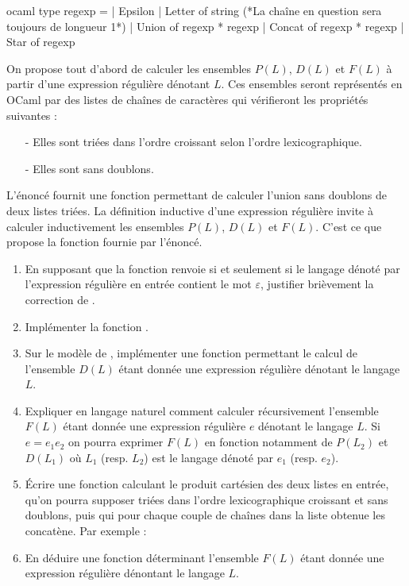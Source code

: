 \documentclass[a4paper, 11pt]{article}
\newenvironment{code-env}
{
  \mdfsetup{
    roundcorner=2pt,
    topline=true,
    leftline=true,
    bottomline=true,
    rightline=true,
    innertopmargin=4pt,
    innerbottommargin=4pt,
    innerrightmargin=4pt,
    innerlinewidth=1pt,
    backgroundcolor={gray!10},
    linecolor={gray!40},
    linewidth=0.1pt,
  }
  \begin{mdframed}[]
  }{\end{mdframed}}
\newenvironment{fancy-code}[1]
  {\VerbatimEnvironment
    \begin{code-env}
    \begin{verbatim}}
 {\end{verbatim}\end{code-env}}
\begin{document}
\medskip

\begin{fancy-code}{ocaml}
type regexp =
  | Epsilon
  | Letter of string (*La chaîne en question sera toujours de longueur 1*)
  | Union of regexp * regexp
  | Concat of regexp * regexp
  | Star of regexp

\end{fancy-code}

On propose tout d'abord de calculer les ensembles $P(L)$, $D(L)$ et $F(L)$ à partir d'une expression régulière dénotant $L$. Ces ensembles seront représentés en OCaml par des listes de chaînes de caractères qui vérifieront les propriétés suivantes : \begin{itemize}
    \item[-] Elles sont triées dans l'ordre croissant selon l'ordre lexicographique.
    \item[-] Elles sont sans doublons.
\end{itemize}

 L'énoncé fournit une fonction  permettant de calculer l'union sans doublons de deux listes triées. La définition inductive d'une expression régulière invite à calculer inductivement les ensembles $P(L)$, $D(L)$ et $F(L)$. C'est ce que propose la fonction  fournie par l'énoncé.

\begin{enumerate}[resume]
    \item En supposant que la fonction  renvoie  si et seulement si le langage dénoté par l'expression régulière en entrée contient le mot $\varepsilon$, justifier brièvement la correction de .
    \item Implémenter la fonction .
    \item Sur le modèle de , implémenter une fonction  permettant le calcul de l'ensemble $D(L)$ étant donnée une expression régulière dénotant le langage $L$.
    \item Expliquer en langage naturel comment calculer récursivement l'ensemble $F(L)$ étant donnée une expression régulière $e$ dénotant le langage $L$. Si $e = e_1e_2$ on pourra exprimer $F(L)$ en fonction notamment de $P(L_2)$ et $D(L_1)$ où $L_1$ (resp. $L_2$) est le langage dénoté par $e_1$ (resp. $e_2$).
    \item \'{E}crire une fonction  calculant le produit cartésien des deux listes en entrée, qu'on pourra supposer triées dans l'ordre lexicographique croissant et sans doublons, puis qui pour chaque couple de chaînes dans la liste obtenue les concatène. Par exemple : \begin{center}
    \end{center}
    \item En déduire une fonction  déterminant l'ensemble $F(L)$ étant donnée une expression régulière dénontant le langage $L$.
\end{enumerate}
\end{document}
